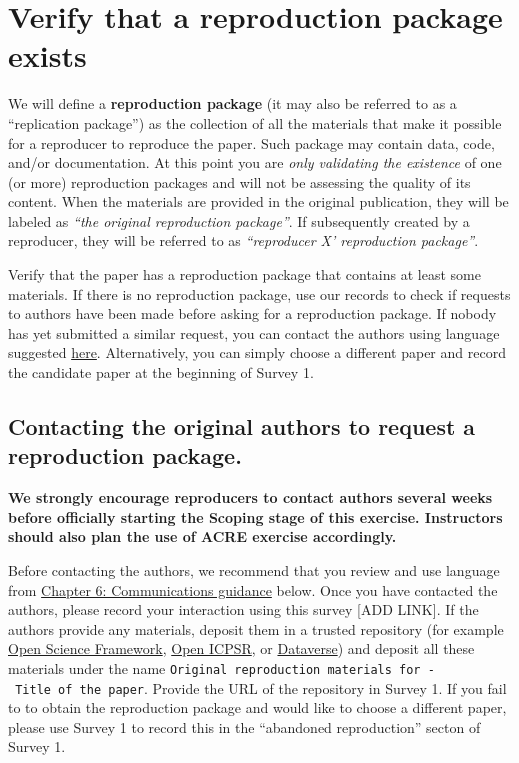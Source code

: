 \documentclass[]{book}
\begin{document}
\hypertarget{verify-rep-mat}{%
\section{Verify that a reproduction package exists}\label{verify-rep-mat}}

We will define a \textbf{reproduction package} (it may also be referred to as a ``replication package'') as the collection of all the materials that make it possible for a reproducer to reproduce the paper. Such package may contain data, code, and/or documentation. At this point you are \emph{only validating the existence} of one (or more) reproduction packages and will not be assessing the quality of its content. When the materials are provided in the original publication, they will be labeled as \emph{``the original reproduction package''}. If subsequently created by a reproducer, they will be referred to as \emph{``reproducer X' reproduction package''}.

Verify that the paper has a reproduction package that contains at least some materials. If there is no reproduction package, use our records to check if requests to authors have been made before asking for a reproduction package. If nobody has yet submitted a similar request, you can contact the authors using language suggested \protect\hyperlink{for-reproducers-contacting-the-authors-of-the-original-study}{here}. Alternatively, you can simply choose a different paper and record the candidate paper at the beginning of Survey 1.

\hypertarget{contacting-the-original-authors-to-request-a-reproduction-package.}{%
\subsection*{Contacting the original authors to request a reproduction package.}\label{contacting-the-original-authors-to-request-a-reproduction-package.}}

\textbf{We strongly encourage reproducers to contact authors several weeks before officially starting the Scoping stage of this exercise. Instructors should also plan the use of ACRE exercise accordingly.}

Before contacting the authors, we recommend that you review and use language from \href{https://bitss.github.io/ACRE/guidance-for-a-constructive-exchange-between-reproducers-and-original-authors.html}{Chapter 6: Communications guidance} below. Once you have contacted the authors, please record your interaction using this survey {[}ADD LINK{]}. If the authors provide any materials, deposit them in a trusted repository (for example \href{https://osf.io/}{Open Science Framework}, \href{https://www.openicpsr.org/openicpsr/}{Open ICPSR}, or \href{https://dataverse.org/}{Dataverse}) and deposit all these materials under the name \texttt{Original\ reproduction\ materials\ for\ -\ Title\ of\ the\ paper}. Provide the URL of the repository in Survey 1. If you fail to to obtain the reproduction package and would like to choose a different paper, please use Survey 1 to record this in the ``abandoned reproduction'' secton of Survey 1.
\end{document}
